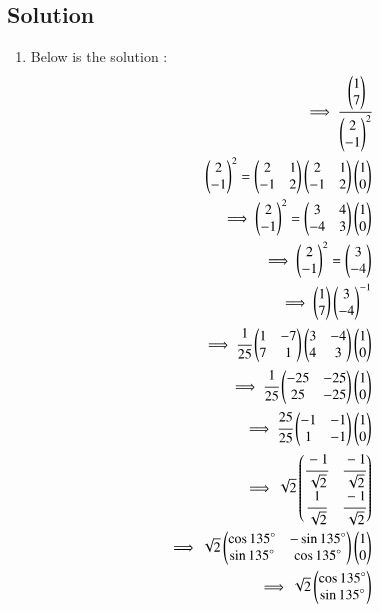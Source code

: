 \begin{enumerate}[label=\thesection.\arabic*.,ref=\thesection.\theenumi]
\section{Solution}
\begin{enumerate}
    \item Below is the solution :
\begin{align}
    \implies \cfrac{\myvec{1 \\ 7}}{\myvec{2 \\ -1}^{2}}
\\
    \myvec{2 \\ -1}^2 = \myvec{2 & 1\\-1 & 2}\myvec{2 & 1\\-1 & 2}\myvec{1 \\ 0}
\\
    \implies \myvec{2 \\ -1}^2 = \myvec{3 & 4\\-4 & 3}\myvec{1 \\ 0}
\\
    \implies \myvec{2 \\ -1}^2 = \myvec{3 \\-4}
\\
    \implies \myvec{1 \\ 7}\myvec{3\\-4}^{-1}
\\
    \implies \cfrac{1}{25}\myvec{1 & -7\\7 & 1}\myvec{3 & -4\\4 & 3}\myvec{1 \\ 0}
\\
    \implies \cfrac{1}{25}\myvec{-25 & -25\\25 & -25}\myvec{1 \\ 0}
\\
    \implies \cfrac{25}{25}\myvec{-1 & -1\\1 & -1}\myvec{1 \\ 0}
\\
    \implies \sqrt{2}\myvec{\cfrac{-1}{\sqrt{2}} & \cfrac{-1}{\sqrt{2}} \\ \cfrac{1}{\sqrt{2}} & \cfrac{-1}{\sqrt{2}}}
\\
    \implies \sqrt{2}\myvec{\cos{135}\degree & -\sin{135}\degree\\ \sin{135}\degree & \cos{135}\degree}\myvec{1 \\ 0}
\\
    \implies \sqrt{2}\myvec{\cos{135}\degree \\ \sin{135}\degree}
\\

\end{align}
\end{enumerate}
\end{enumerate}

